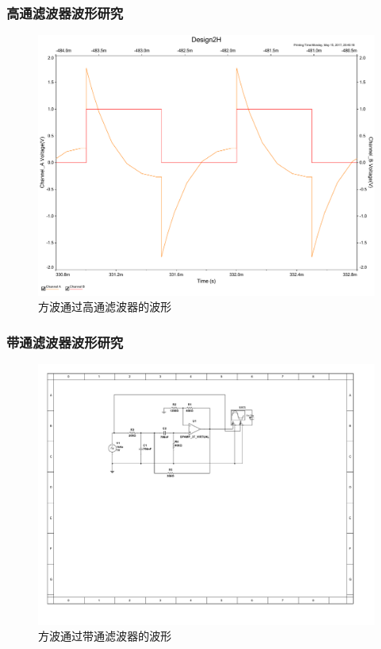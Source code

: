 \documentclass[UTF8,a4paper]{paper}
\begin{document}
\subsubsection{高通滤波器波形研究}
\begin{figure}
\centering
\includegraphics[width=\textwidth]{2H.pdf}
\caption{方波通过高通滤波器的波形}
\label{BIH}
\end{figure}
\subsubsection{带通滤波器波形研究}
\begin{figure}
\centering
\includegraphics[width=\textwidth]{2P.pdf}
\caption{方波通过带通滤波器的波形}
\label{BIP}
\end{figure}
\end{document}
